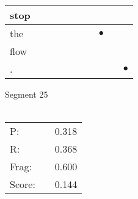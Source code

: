 \documentclass[landscape]{article}
\newcommand{\ssp}{\hspace{2pt}}
\newcommand{\mex}{\cellcolor{g}$\bullet$}
\begin{document}
\begin{tabular}{|l|p{10pt}|p{10pt}|p{10pt}|p{10pt}|p{10pt}|p{10pt}|p{10pt}|p{10pt}|p{10pt}|}
\hline
\ssp stop \ssp&\hspace{2pt}&\hspace{2pt}&\hspace{2pt}&\hspace{2pt}&\hspace{2pt}&\hspace{2pt}&\hspace{2pt}&\hspace{2pt}&\hspace{2pt}\\
\hline
\ssp \cellcolor{ref6}the \ssp&\hspace{2pt}&\hspace{2pt}&\hspace{2pt}&\hspace{2pt}&\hspace{2pt}&\hspace{2pt}&\hspace{2pt}\mex&\hspace{2pt}&\hspace{2pt}\\
\hline
\ssp flow \ssp&\hspace{2pt}&\hspace{2pt}&\hspace{2pt}&\hspace{2pt}&\hspace{2pt}&\hspace{2pt}&\hspace{2pt}&\hspace{2pt}&\hspace{2pt}\\
\hline
\ssp \cellcolor{ref8}. \ssp&\hspace{2pt}&\hspace{2pt}&\hspace{2pt}&\hspace{2pt}&\hspace{2pt}&\hspace{2pt}&\hspace{2pt}&\hspace{2pt}&\hspace{2pt}\mex\\
\hline
\end{tabular}

\vspace{6pt}
\noindent Segment 25\\\\
\noindent\begin{tabular}{lm{12pt}r}
\hline
P:&&0.318\\
R:&&0.368\\
Frag:&&0.600\\
Score:&&0.144\\
\end{tabular}
\end{document}
